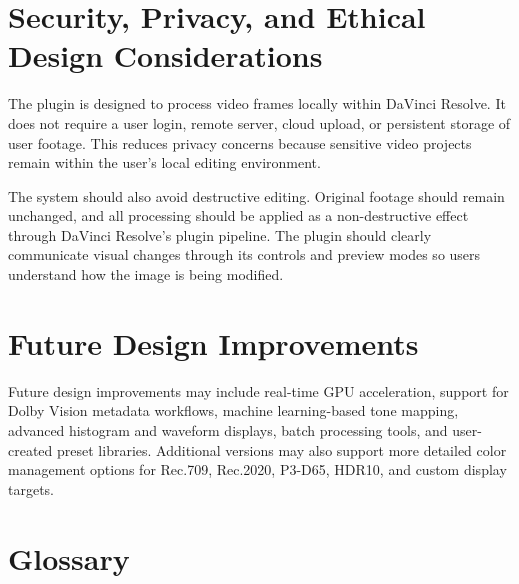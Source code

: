 \documentclass[12pt,hyphens]{article}
\begin{document}

\section{Security, Privacy, and Ethical Design Considerations}

The plugin is designed to process video frames locally within DaVinci Resolve. It does not require a user login, remote server, cloud upload, or persistent storage of user footage. This reduces privacy concerns because sensitive video projects remain within the user's local editing environment.

The system should also avoid destructive editing. Original footage should remain unchanged, and all processing should be applied as a non-destructive effect through DaVinci Resolve's plugin pipeline. The plugin should clearly communicate visual changes through its controls and preview modes so users understand how the image is being modified.


\section{Future Design Improvements}

Future design improvements may include real-time GPU acceleration, support for Dolby Vision metadata workflows, machine learning-based tone mapping, advanced histogram and waveform displays, batch processing tools, and user-created preset libraries. Additional versions may also support more detailed color management options for Rec.709, Rec.2020, P3-D65, HDR10, and custom display targets.


\section*{Glossary}
\end{document}
